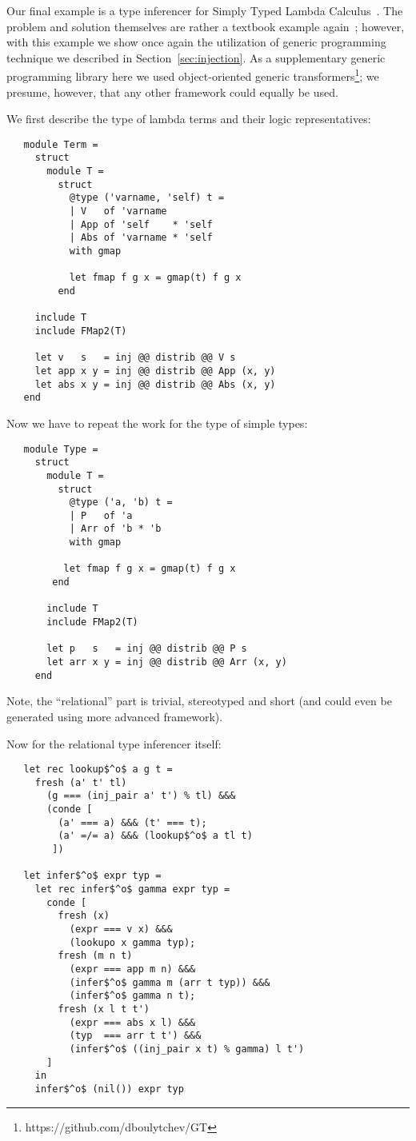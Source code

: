 Our final example is a type inferencer for Simply Typed Lambda Calculus~\cite{Lambda}. The problem and 
solution themselves are rather a textbook example again~\cite{TRS, WillThesis}; however, with this example
we show once again the utilization of generic programming technique we described in Section~\ref{sec:injection}.
As a supplementary generic programming library here we used object-oriented generic transformers\footnote{https://github.com/dboulytchev/GT}; 
we presume, however, that any other framework could equally be used.

We first describe the type of lambda terms and their logic representatives:

\begin{lstlisting}
   module Term = 
     struct
       module T = 
         struct
           @type ('varname, 'self) t =
           | V   of 'varname
           | App of 'self    * 'self
           | Abs of 'varname * 'self
           with gmap

           let fmap f g x = gmap(t) f g x
         end

     include T
     include FMap2(T)

     let v   s   = inj @@ distrib @@ V s
     let app x y = inj @@ distrib @@ App (x, y)
     let abs x y = inj @@ distrib @@ Abs (x, y)
   end
\end{lstlisting}

Now we have to repeat the work for the type of simple types:

\begin{lstlisting}
   module Type = 
     struct
       module T = 
         struct    
           @type ('a, 'b) t = 
           | P   of 'a    
           | Arr of 'b * 'b 
           with gmap

          let fmap f g x = gmap(t) f g x
        end

       include T
       include FMap2(T)

       let p   s   = inj @@ distrib @@ P s
       let arr x y = inj @@ distrib @@ Arr (x, y)
     end
\end{lstlisting}

Note, the ``relational'' part is trivial, stereotyped and short (and could even be generated 
using more advanced framework).

Now for the relational type inferencer itself:

\begin{lstlisting}
   let rec lookup$^o$ a g t =
     fresh (a' t' tl)
       (g === (inj_pair a' t') % tl) &&&
       (conde [
         (a' === a) &&& (t' === t);
         (a' =/= a) &&& (lookup$^o$ a tl t)
        ])

   let infer$^o$ expr typ =
     let rec infer$^o$ gamma expr typ =
       conde [
         fresh (x)
           (expr === v x) &&&
           (lookupo x gamma typ);
         fresh (m n t)
           (expr === app m n) &&&
           (infer$^o$ gamma m (arr t typ)) &&&
           (infer$^o$ gamma n t);
         fresh (x l t t')
           (expr === abs x l) &&&
           (typ  === arr t t') &&&
           (infer$^o$ ((inj_pair x t) % gamma) l t')
       ]
     in
     infer$^o$ (nil()) expr typ
\end{lstlisting}
